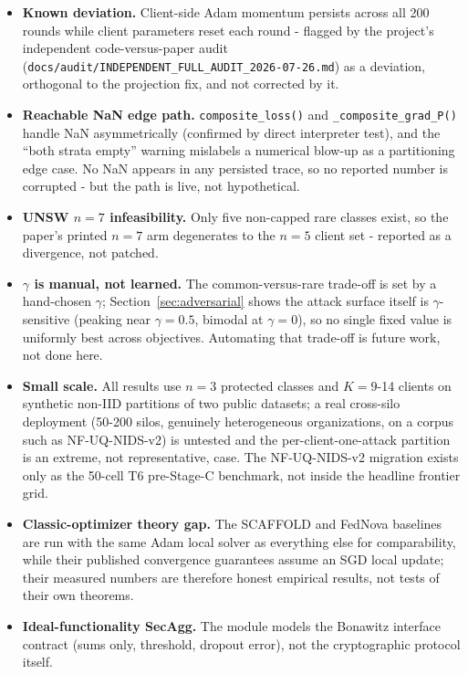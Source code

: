 \documentclass[11pt,a4paper]{report}
\begin{document}
\begin{itemize}
  ever formally published remains open (DBLP returns zero hits); this does
  not affect the algorithmic findings but blocks treating it as a peer
  artifact.
  \item \textbf{Known deviation.} Client-side Adam momentum persists across
  all 200 rounds while client parameters reset each round - flagged by the
  project's independent code-versus-paper audit
  (\texttt{docs/audit/INDEPENDENT\_FULL\_AUDIT\_2026-07-26.md}) as a
  deviation, orthogonal to the projection fix, and not corrected by it.
  \item \textbf{Reachable NaN edge path.} \texttt{composite\_loss()} and
  \texttt{\_composite\_grad\_P()} handle NaN asymmetrically (confirmed by
  direct interpreter test), and the ``both strata empty'' warning mislabels
  a numerical blow-up as a partitioning edge case. No NaN appears in any
  persisted trace, so no reported number is corrupted - but the path is
  live, not hypothetical.
  \item \textbf{UNSW $n = 7$ infeasibility.} Only five non-capped rare
  classes exist, so the paper's printed $n = 7$ arm degenerates to the
  $n = 5$ client set - reported as a divergence, not patched.
  \item \textbf{$\gamma$ is manual, not learned.} The common-versus-rare
  trade-off is set by a hand-chosen $\gamma$; Section~\ref{sec:adversarial}
  shows the attack surface itself is $\gamma$-sensitive (peaking near
  $\gamma = 0.5$, bimodal at $\gamma = 0$), so no single fixed value is
  uniformly best across objectives. Automating that trade-off is future
  work, not done here.
  \item \textbf{Small scale.} All results use $n = 3$ protected classes and
  $K = 9$-14 clients on synthetic non-IID partitions of two public datasets;
  a real cross-silo deployment (50-200 silos, genuinely heterogeneous
  organizations, on a corpus such as NF-UQ-NIDS-v2) is untested and the
  per-client-one-attack partition is an extreme, not representative, case.
  The NF-UQ-NIDS-v2 migration exists only as the 50-cell T6 pre-Stage-C
  benchmark, not inside the headline frontier grid.
  \item \textbf{Classic-optimizer theory gap.} The SCAFFOLD and FedNova
  baselines are run with the same Adam local solver as everything else for
  comparability, while their published convergence guarantees assume an SGD
  local update; their measured numbers are therefore honest empirical
  results, not tests of their own theorems.
  \item \textbf{Ideal-functionality SecAgg.} The module models the
  Bonawitz interface contract (sums only, threshold, dropout error), not
  the cryptographic protocol itself.
\end{itemize}
\end{document}
